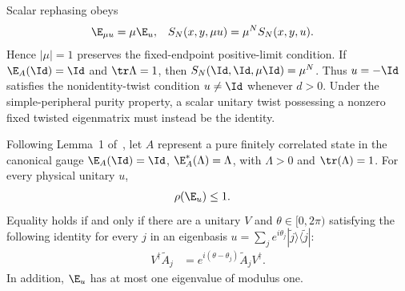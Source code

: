 \begin{lemma}
    \label{lem:physical_string_scalar_phases}
    \leanok
    Scalar rephasing obeys
    \begin{align}
        \E_{\mu u} & =\mu\E_u,
                   & S_N(x,y,\mu u) & =\mu^N S_N(x,y,u).
        \notag
    \end{align}
    Hence $|\mu|=1$ preserves the fixed-endpoint positive-limit condition.
    If $\E_A(\Id)=\Id$ and $\tr\Lambda=1$, then
    $S_N(\Id,\Id,\mu\Id)=\mu^N$. Thus $u=-\Id$ satisfies the
    nonidentity-twist condition $u\ne\Id$ whenever $d>0$.
    Under the simple-peripheral purity property, a scalar unitary twist
    possessing a nonzero fixed twisted eigenmatrix must instead be the
    identity.
\end{lemma}

\begin{lemma}
    \label{lem:pgwsvc08_twisted_spectral_radius}
    \leanok
    Following Lemma~1 of~\cite{PerezGarcia2008StringOrder}, let $A$ represent
    a pure finitely correlated state in the canonical gauge
    $\E_A(\Id)=\Id$, $\E_A^*(\Lambda)=\Lambda$, with $\Lambda>0$ and
    $\tr(\Lambda)=1$.  For every physical unitary $u$,
    \begin{align}
        \rho(\E_u) & \le1.
        \notag
    \end{align}
    Equality holds if and only if there are a unitary $V$ and
    $\theta\in[0,2\pi)$ satisfying the following identity for every $j$ in an
    eigenbasis
    $u=\sum_j e^{i\theta_j}|\widetilde j\rangle\langle\widetilde j|$:
    \begin{align}
        V^\dagger\widetilde A_j
         & =e^{i(\theta-\theta_j)}\widetilde A_jV^\dagger.
        \label{eq:pgwsvc08_lemma1_condition}
    \end{align}
    In addition, $\E_u$ has at most one eigenvalue of modulus one.
\end{lemma}

